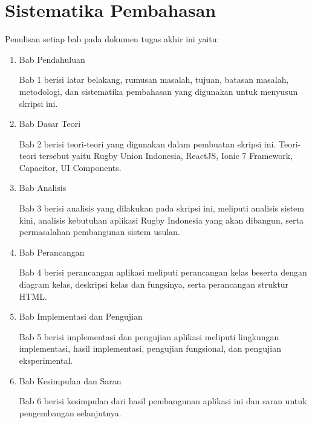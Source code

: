 \section{Sistematika Pembahasan}
\label{sec:sispem}
Penulisan setiap bab pada dokumen tugas akhir ini yaitu:
\begin{enumerate}
    \item Bab Pendahuluan
    
    Bab 1 berisi latar belakang, rumusan masalah, tujuan, batasan masalah, metodologi, dan sistematika pembahasan yang digunakan untuk menyusun skripsi ini.

    \item Bab Dasar Teori
    
    Bab 2 berisi teori-teori yang digunakan dalam pembuatan skripsi ini. Teori-teori tersebut yaitu Rugby Union Indonesia, ReactJS, Ionic 7 Framework, Capacitor, UI Components.

    \item Bab Analisis
    
    Bab 3 berisi analisis yang dilakukan pada skripsi ini, meliputi analisis sistem kini, analisis kebutuhan aplikasi Rugby Indonesia yang akan dibangun, serta permasalahan pembangunan sistem usulan.

    \item Bab Perancangan
    
    Bab 4 berisi perancangan aplikasi meliputi perancangan kelas beserta dengan diagram kelas, deskripsi kelas dan fungsinya, serta perancangan struktur HTML.

    \item Bab Implementasi dan Pengujian
    
    Bab 5 berisi implementasi dan pengujian aplikasi meliputi lingkungan implementasi, hasil implementasi, pengujian fungsional, dan pengujian eksperimental.
    
    \item Bab Kesimpulan dan Saran
    
    Bab 6 berisi kesimpulan dari hasil pembangunan aplikasi ini dan saran untuk pengembangan selanjutnya.
\end{enumerate}

